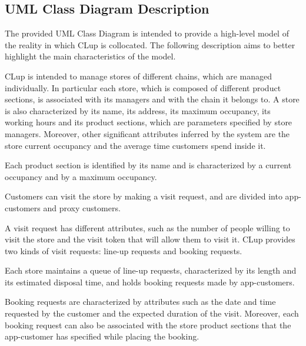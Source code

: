\documentclass[a4paper,oneside,11pt]{book}   %
\begin{document}
    \subsection{UML Class Diagram Description}
    The provided UML Class Diagram is intended to provide a high-level model of the reality in which CLup is collocated. The following description aims to better highlight the main characteristics of the model. \par
    CLup is intended to manage stores of different chains, which are managed individually. In particular each store, which is composed of different product sections, is associated with its managers and with the chain it belongs to. A store is also characterized by its name, its address, its maximum occupancy, its working hours and its product sections, which are parameters specified by store managers. Moreover, other significant attributes inferred by the system are the store current occupancy and the average time customers spend inside it. \par
    Each product section is identified by its name and is characterized by a current occupancy and by a maximum occupancy. \par
    Customers can visit the store by making a visit request, and are divided into app-customers and proxy customers. \par
    A visit request has different attributes, such as the number of people willing to visit the store and the visit token that will allow them to visit it. CLup provides two kinds of visit requests: line-up requests and booking requests. \par
    Each store maintains a queue of line-up requests, characterized by its length and its estimated disposal time, and holds booking requests made by app-customers. \par
    Booking requests are characterized by attributes such as the date and time requested by the customer and the expected duration of the visit. Moreover, each booking request can also be associated with the store product sections that the app-customer has specified while placing the booking.
\end{document}
